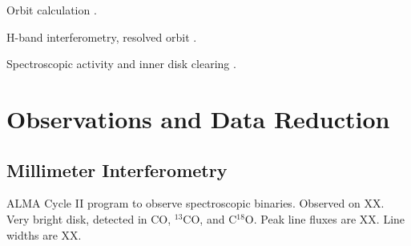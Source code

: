 \documentclass{aastex6}
\newcommand{\twelve}{CO}
\newcommand{\thirteen}{${}^{13}$CO}
\newcommand{\eighteen}{C${}^{18}$O}
\begin{document}
Orbit calculation \citep{mathieu91}.

H-band interferometry, resolved orbit \citep{berger11}.

Spectroscopic activity and inner disk clearing \citep{fang14}.

\section{Observations and Data Reduction}

\subsection{Millimeter Interferometry}

ALMA Cycle II program to observe spectroscopic binaries. Observed on XX. Very bright disk, detected in \twelve, \thirteen, and \eighteen. Peak line fluxes are XX. Line widths are XX.
\end{document}
